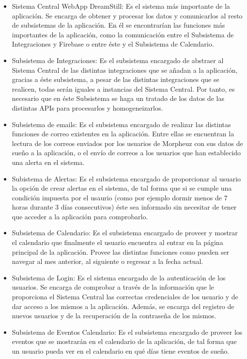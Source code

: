 \documentclass[11pt,openany]{book}
\begin{document}
\begin{itemize}
\item Sistema Central WebApp DreamStill: Es el sistema más importante de la aplicación. Se encarga de obtener y procesar los datos y comunicarlos al resto de subsistemas de la aplicación. En él se encontrarían las funciones más importantes de la aplicación, como la comunicación entre el Subsistema de Integraciones y Firebase o entre éste y el Subsistema de Calendario.
\item Subsistema de Integraciones: Es el subsistema encargado de abstraer al Sistema Central de las distintas integraciones que se añadan a la aplicación, gracias a éste subsistema, a pesar de las distintas integraciones que se realicen, todas serán iguales a instancias del Sistema Central. Por tanto, es necesario que en éste Subsistema se haga un tratado de los datos de las distintas APIs para procesarlos y homogeneizarlos.
\item Subsistema de emails: Es el subsistema encargado de realizar las distintas funciones de correo existentes en la aplicación. Entre ellas se encuentran la lectura de los correos enviados por los usuarios de Morpheuz con sus datos de sueño a la aplicación, o el envío de correos a los usuarios que han establecido una alerta en el sistema.
\item Subistema de Alertas: Es el subsistema encargado de proporcionar al usuario la opción de crear alertas en el sistema, de tal forma que si se cumple una condición impuesta por el usaurio (como por ejemplo dormir menos de 7 horas durante 3 días consecutivos) éste sea informado sin necesitar de tener que acceder a la aplicación para comprobarlo.
\item Subsistema de Calendario: Es el subsistema encargado de proveer y mostrar el calendario que finalmente el usuario encuentra al entrar en la página principal de la aplicación. Provee las distintas funciones como pueden ser navegar al mes anterior, al siguiente o regresar a la fecha actual.
\item Subsistema de Login: Es el sistema encargado de la autenticación de los usuarios. Se encarga de comprobar a través de la información que le proporciona el Sistema Central las correctas credenciales de los usuario y de dar acceso a los mismos a la aplicación. Además, se encarga del registro de nuevos usuarios y de la recuperación de la contraseña de los mismos.
\item Subsistema de Eventos Calendario: Es el subsistema encargado de proveer los eventos que se mostrarán en el calendario de la aplicación, de tal forma que un usuario pueda ver en el calendario en qué días tiene eventos de sueño.

\end{itemize}
\end{document}
